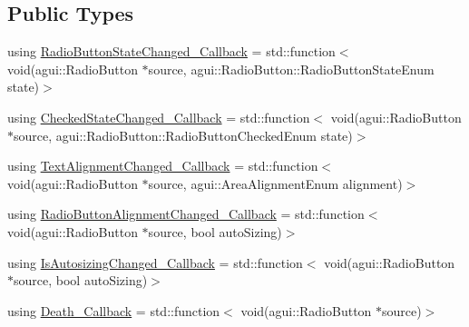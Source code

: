 \subsection*{Public Types}
\begin{DoxyCompactItemize}
\item 
using \mbox{\hyperlink{classec_1_1_generic_radio_button_listener_ab56b850f44f5d460dff301eef04d430b}{Radio\+Button\+State\+Changed\+\_\+\+Callback}} = std\+::function$<$ void(agui\+::\+Radio\+Button $\ast$source, agui\+::\+Radio\+Button\+::\+Radio\+Button\+State\+Enum state)$>$
\item 
using \mbox{\hyperlink{classec_1_1_generic_radio_button_listener_aa2ce6fc7dec8cfb263608c59f6eb338f}{Checked\+State\+Changed\+\_\+\+Callback}} = std\+::function$<$ void(agui\+::\+Radio\+Button $\ast$source, agui\+::\+Radio\+Button\+::\+Radio\+Button\+Checked\+Enum state)$>$
\item 
using \mbox{\hyperlink{classec_1_1_generic_radio_button_listener_a3e8ead6a08363f220625d2f856b9213d}{Text\+Alignment\+Changed\+\_\+\+Callback}} = std\+::function$<$ void(agui\+::\+Radio\+Button $\ast$source, agui\+::\+Area\+Alignment\+Enum alignment)$>$
\item 
using \mbox{\hyperlink{classec_1_1_generic_radio_button_listener_a5abb2fecaaf86a6a0b5c0ce355cdbcb6}{Radio\+Button\+Alignment\+Changed\+\_\+\+Callback}} = std\+::function$<$ void(agui\+::\+Radio\+Button $\ast$source, bool auto\+Sizing)$>$
\item 
using \mbox{\hyperlink{classec_1_1_generic_radio_button_listener_adc874051d63443a9eb1ab194a1730306}{Is\+Autosizing\+Changed\+\_\+\+Callback}} = std\+::function$<$ void(agui\+::\+Radio\+Button $\ast$source, bool auto\+Sizing)$>$
\item 
using \mbox{\hyperlink{classec_1_1_generic_radio_button_listener_aa760bb857feacd099dadc0a1b182c40f}{Death\+\_\+\+Callback}} = std\+::function$<$ void(agui\+::\+Radio\+Button $\ast$source)$>$
\end{DoxyCompactItemize}
